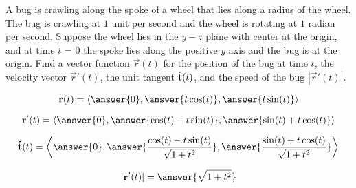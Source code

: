 \documentclass{ximera}
\author{David Guichard \and Neal Koblitz \and H. Jerome Keisler \and Albert Scheller \and Barry Balof \and Mike Wills \and Matthew Carr}
\begin{document}
\begin{exercise}





A bug is crawling along the spoke of a wheel that lies along a radius of the wheel. The bug is crawling at $1$ unit per second and the wheel is rotating at $1$ radian per second. Suppose the wheel lies in the $y-z$ plane with center at the origin, and at time $t$ = 0 the spoke lies along the positive $y$ axis and the bug is at the origin. Find a vector function $\vec{r}(t)$ for the position of the bug at time $t$, the velocity vector $\vec{r}'(t)$, the unit tangent $\mathbf{\hat{t}}(t)$, and the speed of the bug $|\vec{r}'(t)|$. 

\begin{prompt}
\[
\vec{r}(t)=\vector{\answer{0},\answer{t\cos(t)},\answer{t\sin(t)}}
\]
\end{prompt}
\begin{prompt}
\[
\vec{r}'(t)=\vector{\answer{0},\answer{\cos(t)-t\sin(t)},\answer{\sin(t)+t\cos(t)}}
\]
\end{prompt}
\begin{prompt}
\[
\utan(t)=\vector{\answer{0},\answer{\frac{\cos(t)-t\sin(t)}{\sqrt{1+t^2}}},\answer{\frac{\sin(t)+t\cos(t)}{\sqrt{1+t^2}}}}
\]
\end{prompt}
\begin{prompt}
\[
|\vec{r}'(t)|=\answer{\sqrt{1+t^2}}
\]
\end{prompt}


\end{exercise}
\end{document}
